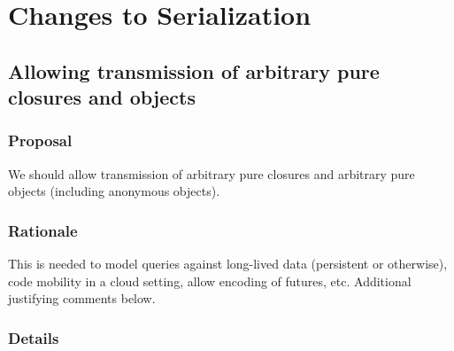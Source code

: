 \section{Changes to Serialization}

\subsection{Allowing transmission of arbitrary pure closures and objects}\label{sec:transmit-closures}

\subsubsection*{Proposal}
We should allow transmission of arbitrary pure closures and arbitrary pure objects (including anonymous objects).

\subsubsection*{Rationale}

This is needed to model queries against long-lived data (persistent or otherwise), code mobility in a cloud setting, allow encoding of futures, etc.  Additional justifying comments below.

\subsubsection*{Details}

